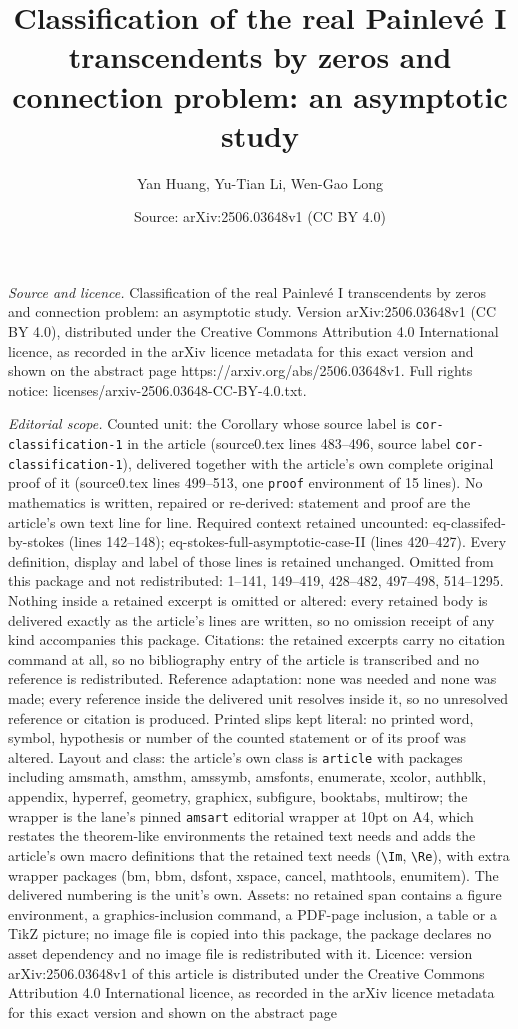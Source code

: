 \documentclass[10pt,a4paper]{amsart}
\title[Classification of the real Painlev\'{e} I transcendents by z]{Classification of the real Painlev\'{e} I transcendents by zeros and connection problem: an asymptotic study}
\author{Yan Huang, Yu-Tian Li, Wen-Gao Long}
\date{Source: arXiv:2506.03648v1 (CC BY 4.0)}
\begin{document}
\maketitle

\noindent\emph{Source and licence.} Classification of the real Painlev\'{e} I transcendents by zeros and connection problem: an asymptotic study. Version arXiv:2506.03648v1 (CC BY 4.0), distributed under the Creative Commons Attribution 4.0 International licence, as recorded in the arXiv licence metadata for this exact version and shown on the abstract page https://arxiv.org/abs/2506.03648v1. Full rights notice: licenses/arxiv-2506.03648-CC-BY-4.0.txt.\par\smallskip

\noindent\textit{Editorial scope.} Counted unit: the Corollary whose source label is \texttt{cor-classification-1} in the article (source0.tex lines 483--496, source label \texttt{cor-classification-1}), delivered together with the article's own complete original proof of it (source0.tex lines 499--513, one \texttt{proof} environment of 15 lines). No mathematics is written, repaired or re-derived: statement and proof are the article's own text line for line. Required context retained uncounted: eq-classifed-by-stokes (lines 142--148); eq-stokes-full-asymptotic-case-II (lines 420--427). Every definition, display and label of those lines is retained unchanged. Omitted from this package and not redistributed: 1--141, 149--419, 428--482, 497--498, 514--1295. Nothing inside a retained excerpt is omitted or altered: every retained body is delivered exactly as the article's lines are written, so no omission receipt of any kind accompanies this package. Citations: the retained excerpts carry no citation command at all, so no bibliography entry of the article is transcribed and no reference is redistributed. Reference adaptation: none was needed and none was made; every reference inside the delivered unit resolves inside it, so no unresolved reference or citation is produced. Printed slips kept literal: no printed word, symbol, hypothesis or number of the counted statement or of its proof was altered. Layout and class: the article's own class is \texttt{article} with packages including amsmath, amsthm, amssymb, amsfonts, enumerate, xcolor, authblk, appendix, hyperref, geometry, graphicx, subfigure, booktabs, multirow; the wrapper is the lane's pinned \texttt{amsart} editorial wrapper at 10pt on A4, which restates the theorem-like environments the retained text needs and adds the article's own macro definitions that the retained text needs (\texttt{\textbackslash Im}, \texttt{\textbackslash Re}), with extra wrapper packages (bm, bbm, dsfont, xspace, cancel, mathtools, enumitem). The delivered numbering is the unit's own. Assets: no retained span contains a figure environment, a graphics-inclusion command, a PDF-page inclusion, a table or a TikZ picture; no image file is copied into this package, the package declares no asset dependency and no image file is redistributed with it. Licence: version arXiv:2506.03648v1 of this article is distributed under the Creative Commons Attribution 4.0 International licence, as recorded in the arXiv licence metadata for this exact version and shown on the abstract page 
\end{document}
